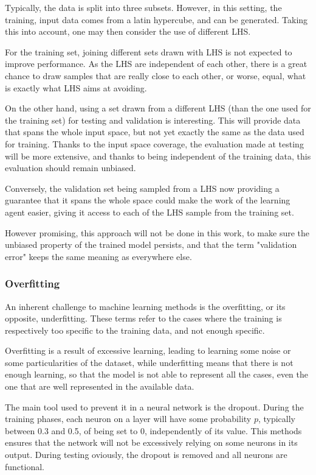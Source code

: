 Typically, the data is split into three subsets. However, in this setting, the training, input data comes from a latin hypercube, and can be generated. Taking this into account, one may then consider the use of different LHS.

For the training set, joining different sets drawn with LHS is not expected to improve performance. As the LHS are independent of each other, there is a great chance to draw samples that are really close to each other, or worse, equal, what is exactly what LHS aims at avoiding.

On the other hand, using a set drawn from a different LHS (than the one used for the training set) for testing and validation is interesting. This will provide data that spans the whole input space, but not yet exactly the same as the data used for training. Thanks to the input space coverage, the evaluation made at testing will be more extensive, and thanks to being independent of the training data, this evaluation should remain unbiased. 

Conversely, the validation set being sampled from a LHS now providing a guarantee that it spans the whole space could make the work of the learning agent easier, giving it access to each of the LHS sample from the training set.

However promising, this approach will not be done in this work, to make sure the unbiased property of the trained model persists, and that the term "validation error" keeps the same meaning as everywhere else.

\subsubsection{Overfitting}

An inherent challenge to machine learning methods is the overfitting, or its opposite, underfitting. These terms refer to the cases where the training is respectively too specific to the training data, and not enough specific.

Overfitting is a result of excessive learning, leading to learning some noise or some particularities of the dataset, while underfitting means that there is not enough learning, so that the model is not able to represent all the cases, even the one that are well represented in the available data.

The main tool used to prevent it in a neural network is the dropout. During the training phases, each neuron on a layer will have some probability $p$, typically between 0.3 and 0.5, of being set to 0, independently of its value. This methods ensures that the network will not be excessively relying on some neurons in its output. During testing oviously, the dropout is removed and all neurons are functional.


